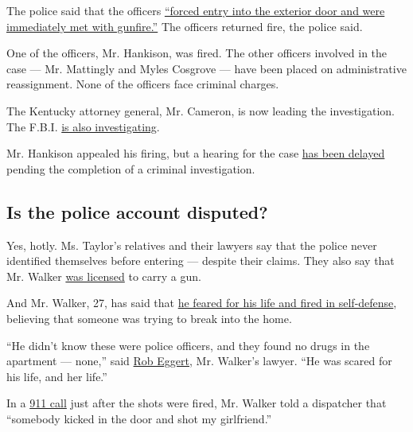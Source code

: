 The police said that the officers
\href{https://www.facebookcorewwwi.onion/LMPD.ky/videos/206839417221050/}{``forced
entry into the exterior door and were immediately met with gunfire.''}
The officers returned fire, the police said.

One of the officers, Mr. Hankison, was fired. The other officers
involved in the case --- Mr. Mattingly and Myles Cosgrove --- have been
placed on administrative reassignment. None of the officers face
criminal charges.

The Kentucky attorney general, Mr. Cameron, is now leading the
investigation. The F.B.I.
\href{https://www.nytimes3xbfgragh.onion/2020/05/21/us/fbi-louisville-shooting.html}{is
also investigating}.

Mr. Hankison appealed his firing, but a hearing for the case
\href{https://www.wdrb.com/news/appeal-delayed-for-fired-lmpd-officer-involved-in-breonna-taylor-raid/article_bf3e5ea8-c602-11ea-9ce8-db2edd607e3a.html}{has
been delayed} pending the completion of a criminal investigation.

\hypertarget{is-the-police-account-disputed}{%
\subsection{Is the police account
disputed?}\label{is-the-police-account-disputed}}

Yes, hotly. Ms. Taylor's relatives and their lawyers say that the police
never identified themselves before entering --- despite their claims.
They also say that Mr. Walker
\href{https://www.nytimes3xbfgragh.onion/2020/05/14/us/breonna-taylor-louisville-shooting.html}{was
licensed} to carry a gun.

And Mr. Walker, 27, has said that
\href{https://www.courier-journal.com/story/news/crime/2020/05/13/breonna-taylor-lawyer-says-louisville-police-need-to-get-story-straight/5183137002/}{he
feared for his life and fired in self-defense}, believing that someone
was trying to break into the home.

``He didn't know these were police officers, and they found no drugs in
the apartment --- none,'' said
\href{https://www.nytimes3xbfgragh.onion/2020/05/22/us/Breonna-Taylor-Kenneth-Walker.html}{Rob
Eggert}, Mr. Walker's lawyer. ``He was scared for his life, and her
life.''

In a
\href{https://www.nytimes3xbfgragh.onion/2020/05/29/us/louisville-protest-shooting-breonna-taylor.html}{911
call} just after the shots were fired, Mr. Walker told a dispatcher that
``somebody kicked in the door and shot my girlfriend.''

